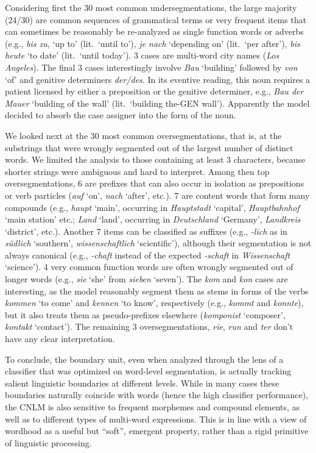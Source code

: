 Considering first the 30 most common undersegmentations, the large
majority (24/30) are common sequences of grammatical terms or very
frequent items that can sometimes be reasonably be re-analyzed as
single function words or adverbs (e.g., \emph{bis zu}, `up to'
(lit.~`until to'), \emph{je nach} `depending on' (lit.~`per after'),
\emph{bis heute} `to date' (lit.~`until today'). 3 cases are
multi-word city names (\emph{Los Angeles}). The final 3 cases
interestingly involve \emph{Bau} `building' followed by \emph{von}
`of' and genitive determiners \emph{der/des}. In its eventive reading,
this noun requires a patient licensed by either a preposition or the
genitive determiner, e.g., \emph{Bau der Mauer} `building of the wall'
(lit.~`building the-GEN wall'). Apparently the model decided to absorb
the case assigner into the form of the noun.

We looked next at the 30 most common oversegmentations, that is, at the
 substrings that were wrongly segmented out of the largest
number of distinct words. We limited the analysis to those containing
at least 3 characters, because shorter strings were ambiguous and
hard to interpret. Among then top oversegmentations, 6 are prefixes that can also occur in
isolation as prepositions or verb particles (\emph{auf} `on',
\emph{nach} `after', etc.). 7 are content words that form many
compounds (e.g., \emph{haupt} `main', occurring in \emph{Hauptstadt}
`capital', \emph{Hauptbahnhof} `main station' etc.; \emph{Land}
`land', occurring in \emph{Deutschland} `Germany', \emph{Landkreis}
`district', etc.). Another 7 items can be classified as suffixes
(e.g., \emph{-lich} as in \emph{s\"udlich} `southern',
\emph{wissenschaftlich} `scientific'), although their segmentation is
not always canonical (e.g., \emph{-chaft} instead of the expected
\emph{-schaft} in \emph{Wissenschaft} `science'). 4 very common
function words are often wrongly segmented out of longer words (e.g.,
\emph{sie} `she' from \emph{sieben} `seven'). The \emph{kom} and
\emph{kon} cases are interesting, as the model
reasonably segment them as stems in forms of the verbs \emph{kommen} `to
come' and \emph{kennen} `to know', respectively (e.g., \emph{kommt}
and \emph{konnte}), but it also treats them as pseudo-prefixes elsewhere
(\emph{komponist} `composer', \emph{kontakt} `contact'). The remaining
3 oversegmentations, \emph{rie}, \emph{run} and \emph{ter} don't have
any clear interpretation.

To conclude, the boundary unit, even when
analyzed through the lens of a classifier that was optimized on
word-level segmentation, is actually tracking salient linguistic
boundaries at different levels. While in many cases these boundaries
naturally coincide with words (hence the high classifier performance),
the CNLM is also sensitive to frequent morphemes and compound
elements, as well as to different types of multi-word
expressions. This is in line with a view of wordhood as a useful but
``soft'', emergent property, rather than a rigid primitive of
linguistic processing.

